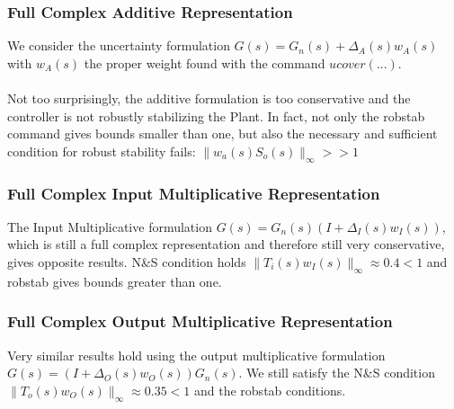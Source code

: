 \documentclass[a4paper, 12pt]{article}
\begin{document}
\subsubsection{Full Complex Additive Representation}
We consider the uncertainty formulation $G(s) = G_n(s) + \Delta_A(s) w_A(s)$ with $w_A(s)$ the proper weight found with the command $ucover(...)$.\\ \\
Not too surprisingly, the additive formulation is too conservative and the controller is not robustly stabilizing the Plant. In fact, not only the robstab command gives bounds smaller than one, but also the necessary and sufficient condition for robust stability fails: $\|w_a(s) S_o(s)\|_\infty >> 1$

\subsubsection{Full Complex Input Multiplicative Representation}
The Input Multiplicative formulation $G(s) = G_n(s)(I + \Delta_I(s) w_I(s))$, which is still a full complex representation and therefore still very conservative, gives opposite results. N\&S condition holds $\|T_i(s)w_I(s) \|_\infty \approx 0.4 < 1$ and robstab gives bounds greater than one.
\subsubsection{Full Complex Output Multiplicative Representation}
Very similar results hold using the output multiplicative formulation \\ $G(s) = (I + \Delta_O(s) w_O(s))G_n(s)$. We still satisfy the N\&S condition \\$\|T_o(s)w_O(s) \|_\infty \approx 0.35 < 1$ and the robstab conditions.
\end{document}
